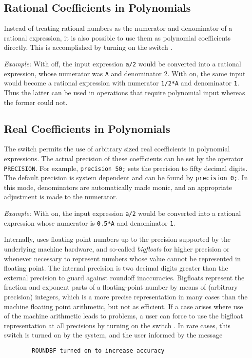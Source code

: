 \subsection{Rational Coefficients in Polynomials}
\hypertarget{switch:RATIONAL}{}
Instead of treating rational numbers as the numerator and denominator of a
rational expression, it is also possible to use them as polynomial
coefficients directly. This is accomplished by turning on the switch
.

\textit{Example:} With  off, the input expression \texttt{a/2}
would be converted into a rational expression, whose numerator was \texttt{A}
and denominator 2.  With  on, the same input would become a
rational expression with numerator \texttt{1/2*A} and denominator \texttt{1}.
Thus the latter can be used in operations that require polynomial input
whereas the former could not.

\subsection{Real Coefficients in Polynomials}
\hypertarget{switch:ROUNDED}{}
\hypertarget{switch:ROUNDBF}{}
\hypertarget{operator:PRECISION}{}
The switch  permits the use of arbitrary
sized real coefficients in polynomial expressions.  The actual precision
of these coefficients can be set by the operator \texttt{PRECISION}.
 For example, \texttt{precision 50;} sets the precision to
fifty decimal digits.  The default precision is system dependent and can
be found by \texttt{precision 0;}.  In this mode, denominators are
automatically made monic, and an appropriate adjustment is made to the
numerator.

\textit{Example:} With  on, the input expression \texttt{a/2} would
be converted into a rational expression whose numerator is \texttt{0.5*A} and
denominator \texttt{1}.

Internally, {\REDUCE} uses floating point numbers up to the precision
supported by the underlying machine hardware, and so-called \emph{bigfloats} 
for higher precision or whenever necessary to represent numbers
whose value cannot be represented in floating point.  The internal
precision is two decimal digits greater than the external precision to
guard against roundoff inaccuracies.  Bigfloats represent the fraction and
exponent parts of a floating-point number by means of (arbitrary
precision) integers, which is a more precise representation in many cases
than the machine floating point arithmetic, but not as efficient.  If a
case arises where use of the machine arithmetic leads to problems, a user
can force {\REDUCE} to use the bigfloat representation at all precisions by
turning on the switch .  In rare cases,
this switch is turned on by the system, and the user informed by the
message
\begin{verbatim}
        ROUNDBF turned on to increase accuracy
\end{verbatim}

